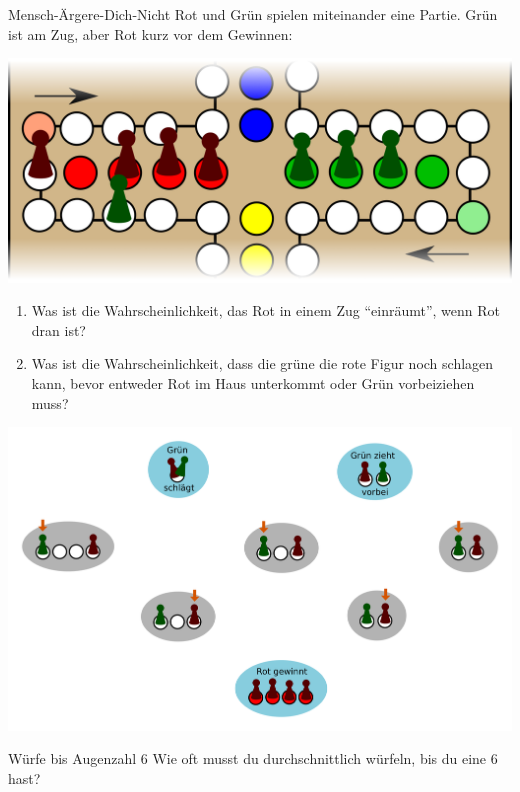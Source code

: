 \documentclass{uebungszettel}
\begin{document}
\begin{aufgabe}{Mensch-Ärgere-Dich-Nicht}
  Rot und Grün spielen miteinander eine Partie.
  Grün ist am Zug, aber Rot kurz vor dem Gewinnen: 
  \begin{center}
    \includegraphics{mensch-aergere-dich-nicht}
  \end{center}
  \begin{enumerate}
    \item Was ist die Wahrscheinlichkeit, das Rot in einem Zug "`einräumt"', wenn Rot dran ist?
    \item Was ist die Wahrscheinlichkeit, dass die grüne die rote Figur noch schlagen kann, bevor entweder Rot im Haus unterkommt oder Grün vorbeiziehen muss?
  \end{enumerate}
  \begin{center}
    \includegraphics[width=16cm]{mensch-aergere-dich-nicht-zustaende}
  \end{center}
\end{aufgabe}

\begin{aufgabe}{Würfe bis Augenzahl $6$}
  Wie oft musst du durchschnittlich würfeln, bis du eine 6 hast?
\end{aufgabe}
\end{document}
